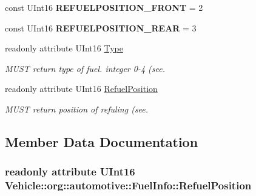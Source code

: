 \begin{DoxyCompactItemize}
\item 
\hypertarget{interfaceVehicle_1_1org_1_1automotive_1_1FuelInfo_a9ca8e6f780d11b5ed97813ea7d97c28f}{const U\-Int16 {\bfseries R\-E\-F\-U\-E\-L\-P\-O\-S\-I\-T\-I\-O\-N\-\_\-\-F\-R\-O\-N\-T} = 2}\label{interfaceVehicle_1_1org_1_1automotive_1_1FuelInfo_a9ca8e6f780d11b5ed97813ea7d97c28f}

\item 
\hypertarget{interfaceVehicle_1_1org_1_1automotive_1_1FuelInfo_a6c8568e5aceb8474b4019790b4926f70}{const U\-Int16 {\bfseries R\-E\-F\-U\-E\-L\-P\-O\-S\-I\-T\-I\-O\-N\-\_\-\-R\-E\-A\-R} = 3}\label{interfaceVehicle_1_1org_1_1automotive_1_1FuelInfo_a6c8568e5aceb8474b4019790b4926f70}

\item 
readonly attribute U\-Int16 \hyperlink{interfaceVehicle_1_1org_1_1automotive_1_1FuelInfo_a8c6fd4e9e6e87441b5bef2567edcfb6d}{Type}
\begin{DoxyCompactList}\small\item\em M\-U\-S\-T return type of fuel. integer 0-\/4 (see. \end{DoxyCompactList}\item 
readonly attribute U\-Int16 \hyperlink{interfaceVehicle_1_1org_1_1automotive_1_1FuelInfo_a8ba5705b997de5221c98dfb57fb68ea7}{Refuel\-Position}
\begin{DoxyCompactList}\small\item\em M\-U\-S\-T return position of refuling (see. \end{DoxyCompactList}\end{DoxyCompactItemize}


\subsection{Member Data Documentation}
\hypertarget{interfaceVehicle_1_1org_1_1automotive_1_1FuelInfo_a8ba5705b997de5221c98dfb57fb68ea7}{
\subsubsection[{Refuel\-Position}]{\setlength{\rightskip}{0pt plus 5cm}readonly attribute U\-Int16 Vehicle\-::org\-::automotive\-::\-Fuel\-Info\-::\-Refuel\-Position}}\label{interfaceVehicle_1_1org_1_1automotive_1_1FuelInfo_a8ba5705b997de5221c98dfb57fb68ea7}


